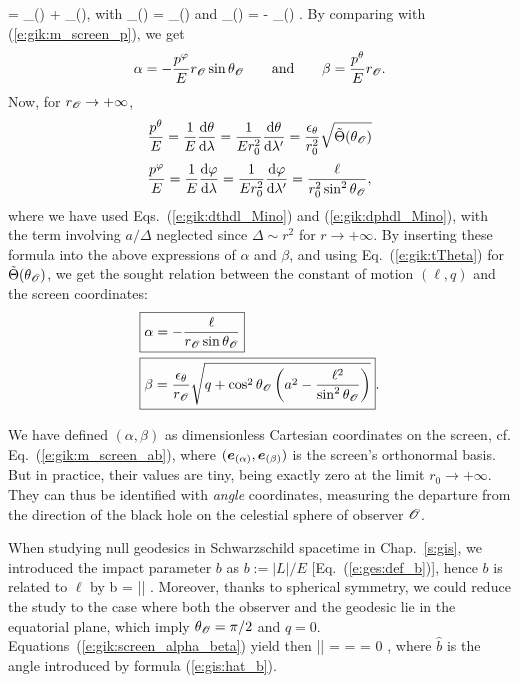 \be \label{e:gik:m_screen_ab}
     = \alpha {}_{(\alpha)} + \beta {}_{(\beta)}, \quad\mbox{with}\quad
    _{(\alpha)} = _{(\ph)} \quad\mbox{and}\quad
    _{(\beta)} = - _{(\th)} .
\ee
By comparing with (\ref{e:gik:m_screen_p}), we get
\[
    \alpha = -  \frac{p^\varphi}{E} r_{\mathscr{O}} \sin\theta_{\mathscr{O}}
    \qquad\mbox{and}\qquad
    \beta = \frac{p^\theta}{E} r_{\mathscr{O}} .
\]
Now, for $r_{\mathscr{O}}\to +\infty$,
\[
   \frac{p^\theta}{E} = \frac{1}{E} \frac{\mathrm{d} \theta}{\mathrm{d} \lambda} = \frac{1}{E r_0^2}  \frac{\mathrm{d} \theta}{\mathrm{d} \lambda'} =
    \frac{\epsilon_\theta}{r_0^2} \sqrt{\tilde\Theta(\theta_{\mathscr{O}})}
\]
\[
 \frac{p^\varphi}{E} = \frac{1}{E} \frac{\mathrm{d} \varphi}{\mathrm{d} \lambda} = \frac{1}{E r_0^2}  \frac{\mathrm{d} \varphi}{\mathrm{d} \lambda'}
 = \frac{\ell}{r_0^2 \sin^2\theta_{\mathscr{O}}} ,
\]
where we have used Eqs.~(\ref{e:gik:dthdl_Mino}) and (\ref{e:gik:dphdl_Mino}), with the
term involving $a/\Delta$ neglected since $\Delta \sim r^2$ for $r\to +\infty$.
By inserting these formula into the above expressions of $\alpha$ and $\beta$,
and using Eq.~(\ref{e:gik:tTheta}) for $\tilde\Theta(\theta_{\mathscr{O}})$,
we get the sought relation between the constant of motion $(\ell, q)$ and
the screen coordinates:
\begin{subequations}
\label{e:gik:screen_alpha_beta}
\begin{align}
& \fbox{$\displaystyle  \alpha = - \frac{\ell}{r_{\mathscr{O}}\sin\theta_{\mathscr{O}}} $} \\
& \fbox{$\displaystyle  \beta = \frac{\epsilon_\theta}{r_{\mathscr{O}}} \sqrt{ q + \cos^2\theta_{\mathscr{O}} \left( a^2
    - \frac{\ell^2}{\sin^2\theta_{\mathscr{O}}} \right) } $} .
\end{align}
\end{subequations}

\begin{remark}
We have defined $(\alpha,\beta)$ as dimensionless Cartesian coordinates on
the screen, cf. Eq.~(\ref{e:gik:m_screen_ab}), where $(\bm{e}_{(\alpha)}, \bm{e}_{(\beta)})$
is the screen's orthonormal basis. But in practice, their values are tiny,
being exactly zero at the limit $r_0\to +\infty$. They can thus be identified
with \emph{angle} coordinates, measuring the departure from the direction
of the black hole on the celestial sphere of observer $\mathscr{O}$.
\end{remark}

\begin{remark}
When studying null geodesics in Schwarzschild spacetime in Chap.~\ref{s:gis}, we
introduced the impact parameter $b$ as $b := |L|/E$ [Eq.~(\ref{e:ges:def_b})], hence
$b$ is related to $\ell$ by
\be
    b = |\ell| .
\ee
Moreover, thanks to spherical symmetry, we could reduce the study to the case
where both the observer
and the geodesic lie in the equatorial plane, which imply $\theta_{\mathscr{O}} = \pi/2$
and $q=0$. Equations~(\ref{e:gik:screen_alpha_beta}) yield then
\be
    |\alpha| =  =  \qand \beta = 0 ,
\ee
where $\hat{b}$ is the angle introduced by formula (\ref{e:gis:hat_b}).
\end{remark}

